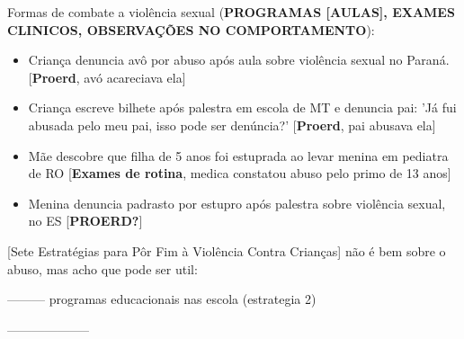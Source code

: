 Formas de combate a violência sexual (\textbf{PROGRAMAS [AULAS], EXAMES CLINICOS, OBSERVAÇÕES NO COMPORTAMENTO}):

\begin{itemize}
  \item Criança denuncia avô por abuso após aula sobre violência sexual no Paraná. \cite{central2019crianca} [\textbf{Proerd}, avó acareciava ela]
  \item Criança escreve bilhete após palestra em escola de MT e denuncia pai: 'Já fui abusada pelo meu pai, isso pode ser denúncia?' \cite{lidiane2018crianca} [\textbf{Proerd}, pai abusava ela]
  \item Mãe descobre que filha de 5 anos foi estuprada ao levar menina em pediatra de RO \cite{jonatas2018crianca} [\textbf{Exames de rotina}, medica constatou abuso pelo primo de 13 anos]
  \item Menina denuncia padrasto por estupro após palestra sobre violência sexual, no ES [\textbf{PROERD?}]
\end{itemize}








[Sete Estratégias para Pôr Fim à Violência Contra Crianças] não é bem sobre o abuso, mas acho que pode ser util: %




--------- programas educacionais nas escola (estrategia 2)





-------------------- 








